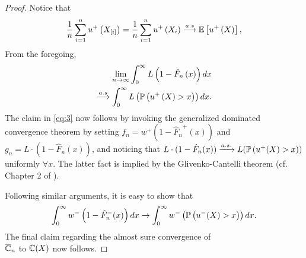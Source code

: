 \begin{proof}
Notice that 
\begin{align*}
\frac{1}{n}
\sum_{i=1}^n u^+\left(X_{[i]}\right)
=
\frac{1}{n}
\sum_{i=1}^n u^+\left(X_{i}\right)
\overset{a.s}\longrightarrow 
\mathbb{E}\left[u^+\left(X\right)\right],
\end{align*}
From the foregoing,
\begin{align*}
\lim_{n\rightarrow \infty} \int_0^{\infty} L\left(1-\hat{F}_n\left(x\right)\right) dx\\
\overset{a.s} \longrightarrow
\int_0^{\infty} L \left(\mathbb{P}\left( u^+\left(X\right)>x \right)\right) dx.
\end{align*}
The claim in \eqref{eq:3} now follows by invoking the generalized dominated convergence theorem by setting $f_n = w^+(1-{\hat F_n}^+(x))$ and $g_n = L\cdot(1-\hat{F}_n(x))$, and noticing that $L\cdot(1-\hat{F}_n(x)) \xrightarrow{a.s.} L(\mathbb{P}\left( u^+(X)>x \right))$ uniformly $\forall x$. The latter fact is implied by the Glivenko-Cantelli theorem (cf. Chapter 2 of \cite{wasserman2006}).

Following similar arguments, it is easy to show that 
$$
\int_0^{\infty} w^-\left(1-{\hat F_n}^-(x)\right)  dx \rightarrow \int_0^{\infty} w^-\left(\mathbb{P}\left( u^-(X)>x \right)\right) dx.
$$
The final claim regarding the almost sure convergence of \\$\overline {\mathbb{C}}_n$ to $\mathbb{C}(X)$ now follows.
\end{proof}

